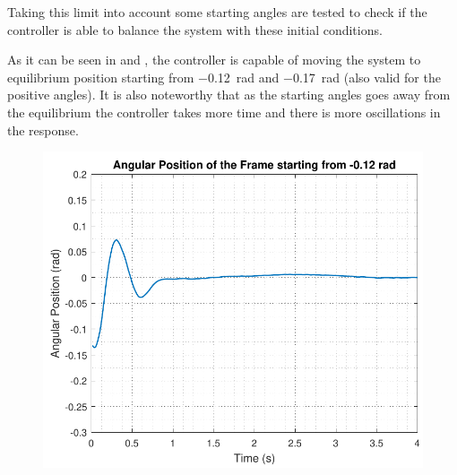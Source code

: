 Taking this limit into account some starting angles are tested to check if the controller is able to balance the system with these initial conditions. 

As it can be seen in  and , the controller is capable of moving the system to equilibrium position starting from \SI{-0,12}{rad} and \SI{-0,17}{rad} (also valid for the positive angles). It is also noteworthy that as the starting angles goes away from the equilibrium the controller takes more time and there is more oscillations in the response.

\begin{minipage}{\linewidth}
	\begin{minipage}{0.45\linewidth}
		\begin{figure}[H]
			\includegraphics[scale=.55]{figures/testCatch_12}
			\centering
			\captionsetup{justification=centering}
			\label{testCatch_12}
		\end{figure}
	\end{minipage}
	\hspace{0.03\linewidth}
	\begin{minipage}{0.45\linewidth}
		\begin{figure}[H]\vspace{-3mm}

\end{figure}
\end{minipage}
\end{minipage}
